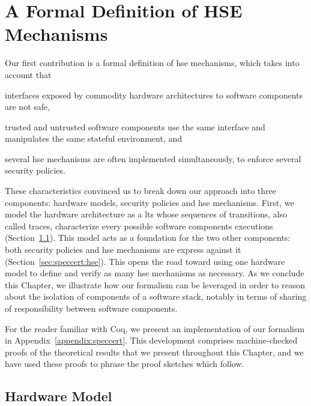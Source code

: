 \chapter{A Formal Definition of HSE Mechanisms}
\label{chapter:speccert}


\vspace{1cm}\noindent
%
Our first contribution is a formal definition of \ac{hse} mechanisms, which
takes into account that
%
\begin{inparaenum}[(1)]
\item interfaces exposed by commodity hardware architectures to software
  components are not safe,
\item trusted and untrusted software components use the same interface and
  manipulates the same stateful environment, and
\item several \ac{hse} mechanisms are often implemented simultaneously, to
  enforce several security policies.
\end{inparaenum}

These characteristics convinced us to break down our approach into three
components: hardware models, security policies and \ac{hse} mechanisms.
%
First, we model the hardware architecture as a \ac{lts} whose sequences of
transitions, also called traces, characterize every possible software components
executions (Section~\ref{subsec:speccert:hardware}).
%
This model acts as a foundation for the two other components: both security
policies and \ac{hse} mechanisms are express against it
(Section~\ref{sec:speccert:hse}).
%
This opens the road toward using one hardware model to define and verify as many
\ac{hse} mechanisms as necessary.
%
As we conclude this Chapter, we illustrate how our formalism can be leveraged in
order to reason about the isolation of components of a software stack, notably
in terms of sharing of responsibility between software components.

For the reader familiar with Coq, we present an implementation of our formalism
in Appendix~\ref{appendix:speccert}.
%
This development comprises machine-checked proofs of the theoretical results
that we present throughout this Chapter, and we have used these proofs to phrase
the proof sketches which follow.

\section{Hardware Model}
\label{subsec:speccert:hardware}

